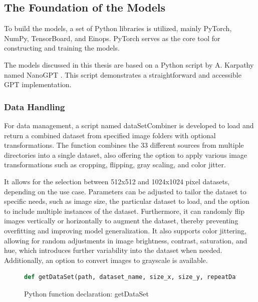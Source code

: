 
    \subsection{The Foundation of the Models}

    To build the models, a set of Python libraries is utilized, mainly PyTorch, NumPy, TensorBoard, and Einops. PyTorch serves as the core tool for constructing and training the models.
    
    The models discussed in this thesis are based on a Python script by A. Karpathy named NanoGPT \autocite{nanoGPTkarpathy2023}. This script demonstrates a straightforward and accessible GPT implementation. 
    
    \subsubsection{Data Handling}
    
    For data management, a script named dataSetCombiner is developed to load and return a combined dataset from specified image folders with optional transformations. The function combines the 33 different sources from multiple directories into a single dataset, also offering the option to apply various image transformations such as cropping, flipping, gray scaling, and color jitter.
    
    It allows for the selection between 512x512 and 1024x1024 pixel datasets, depending on the use case. Parameters can be adjusted to tailor the dataset to specific needs, such as image size, the particular dataset to load, and the option to include multiple instances of the dataset. Furthermore, it can randomly flip images vertically or horizontally to augment the dataset, thereby preventing overfitting and improving model generalization. It also supports color jittering, allowing for random adjustments in image brightness, contrast, saturation, and hue, which introduces further variability into the dataset when needed. Additionally, an option to convert images to grayscale is available.
    

\begin{figure}[H]
\centering
\begin{lstlisting}[language=Python]
    def getDataSet(path, dataset_name, size_x, size_y, repeatData=1, random_vertical_flip=False, random_horizontal_flip=False, crop_type='random', grayscale=False, color_jitter=False, jitter_brightness=0, jitter_contrast=0, jitter_saturation=0, jitter_hue=0):
\end{lstlisting}
\caption{Python function declaration: getDataSet}
\label{fig:getDataSet}
\end{figure}


